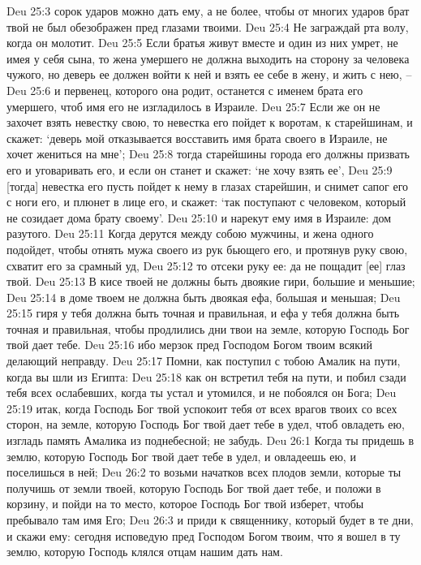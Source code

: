 Deu 25:3  сорок ударов можно дать ему, а не более, чтобы от многих ударов брат твой не был обезображен пред глазами твоими.
Deu 25:4  Не заграждай рта волу, когда он молотит.
Deu 25:5  Если братья живут вместе и один из них умрет, не имея у себя сына, то жена умершего не должна выходить на сторону за человека чужого, но деверь ее должен войти к ней и взять ее себе в жену, и жить с нею, --
Deu 25:6  и первенец, которого она родит, останется с именем брата его умершего, чтоб имя его не изгладилось в Израиле.
Deu 25:7  Если же он не захочет взять невестку свою, то невестка его пойдет к воротам, к старейшинам, и скажет: `деверь мой отказывается восставить имя брата своего в Израиле, не хочет жениться на мне';
Deu 25:8  тогда старейшины города его должны призвать его и уговаривать его, и если он станет и скажет: `не хочу взять ее',
Deu 25:9  [тогда] невестка его пусть пойдет к нему в глазах старейшин, и снимет сапог его с ноги его, и плюнет в лице его, и скажет: `так поступают с человеком, который не созидает дома брату своему'.
Deu 25:10  и нарекут ему имя в Израиле: дом разутого.
Deu 25:11  Когда дерутся между собою мужчины, и жена одного подойдет, чтобы отнять мужа своего из рук бьющего его, и протянув руку свою, схватит его за срамный уд,
Deu 25:12  то отсеки руку ее: да не пощадит [ее] глаз твой.
Deu 25:13  В кисе твоей не должны быть двоякие гири, большие и меньшие;
Deu 25:14  в доме твоем не должна быть двоякая ефа, большая и меньшая;
Deu 25:15  гиря у тебя должна быть точная и правильная, и ефа у тебя должна быть точная и правильная, чтобы продлились дни твои на земле, которую Господь Бог твой дает тебе.
Deu 25:16  ибо мерзок пред Господом Богом твоим всякий делающий неправду.
Deu 25:17  Помни, как поступил с тобою Амалик на пути, когда вы шли из Египта:
Deu 25:18  как он встретил тебя на пути, и побил сзади тебя всех ослабевших, когда ты устал и утомился, и не побоялся он Бога;
Deu 25:19  итак, когда Господь Бог твой успокоит тебя от всех врагов твоих со всех сторон, на земле, которую Господь Бог твой дает тебе в удел, чтоб овладеть ею, изгладь память Амалика из поднебесной; не забудь.
Deu 26:1  Когда ты придешь в землю, которую Господь Бог твой дает тебе в удел, и овладеешь ею, и поселишься в ней;
Deu 26:2  то возьми начатков всех плодов земли, которые ты получишь от земли твоей, которую Господь Бог твой дает тебе, и положи в корзину, и пойди на то место, которое Господь Бог твой изберет, чтобы пребывало там имя Его;
Deu 26:3  и приди к священнику, который будет в те дни, и скажи ему: сегодня исповедую пред Господом Богом твоим, что я вошел в ту землю, которую Господь клялся отцам нашим дать нам.
